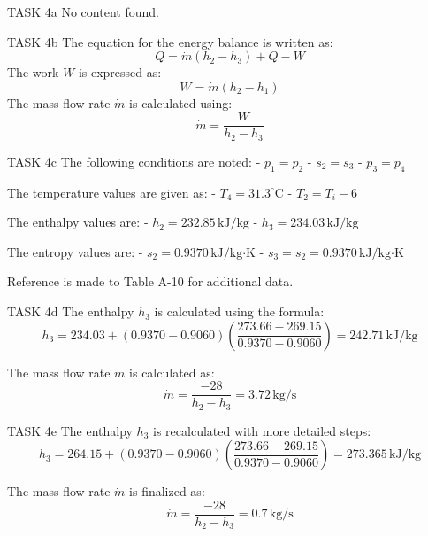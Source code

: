 TASK 4a  
No content found.

TASK 4b  
The equation for the energy balance is written as:  
\[
Q = \dot{m} (h_2 - h_3) + Q - W
\]  
The work \( W \) is expressed as:  
\[
W = \dot{m} (h_2 - h_1)
\]  
The mass flow rate \( \dot{m} \) is calculated using:  
\[
\dot{m} = \frac{W}{h_2 - h_3}
\]

TASK 4c  
The following conditions are noted:  
- \( p_1 = p_2 \)  
- \( s_2 = s_3 \)  
- \( p_3 = p_4 \)  

The temperature values are given as:  
- \( T_4 = 31.3^\circ\text{C} \)  
- \( T_2 = T_i - 6 \)  

The enthalpy values are:  
- \( h_2 = 232.85 \, \text{kJ/kg} \)  
- \( h_3 = 234.03 \, \text{kJ/kg} \)  

The entropy values are:  
- \( s_2 = 0.9370 \, \text{kJ/kg·K} \)  
- \( s_3 = s_2 = 0.9370 \, \text{kJ/kg·K} \)  

Reference is made to Table A-10 for additional data.

TASK 4d  
The enthalpy \( h_3 \) is calculated using the formula:  
\[
h_3 = 234.03 + (0.9370 - 0.9060) \left( \frac{273.66 - 269.15}{0.9370 - 0.9060} \right) = 242.71 \, \text{kJ/kg}
\]  

The mass flow rate \( \dot{m} \) is calculated as:  
\[
\dot{m} = \frac{-28}{h_2 - h_3} = 3.72 \, \text{kg/s}
\]

TASK 4e  
The enthalpy \( h_3 \) is recalculated with more detailed steps:  
\[
h_3 = 264.15 + (0.9370 - 0.9060) \left( \frac{273.66 - 269.15}{0.9370 - 0.9060} \right) = 273.365 \, \text{kJ/kg}
\]  

The mass flow rate \( \dot{m} \) is finalized as:  
\[
\dot{m} = \frac{-28}{h_2 - h_3} = 0.7 \, \text{kg/s}
\]